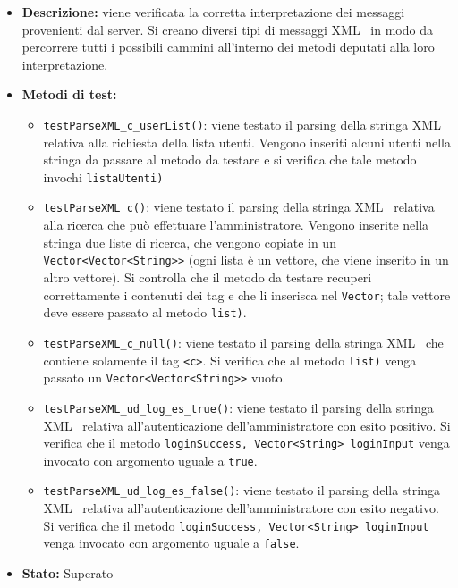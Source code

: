 {\begin{sloppypar}
{{\begin{itemize}
\begin{itemize}
					\item[] \textbf{Descrizione:} viene verificata la corretta interpretazione dei messaggi provenienti dal server. Si creano diversi tipi di messaggi XML\g~ in modo da percorrere tutti i possibili cammini all'interno dei metodi deputati alla loro interpretazione.

					\item[] \textbf{Metodi di test:}

					\begin{itemize}
						\item \texttt{testParseXML\_c\_userList()}: viene testato il parsing della stringa XML\g~ relativa alla richiesta della lista utenti. Vengono inseriti alcuni utenti nella stringa da passare al metodo da testare e si verifica che tale metodo invochi  \texttt{listaUtenti)}
						
						\item \texttt{testParseXML\_c()}: viene testato il parsing della stringa XML\g~ relativa alla ricerca che può effettuare l'amministratore. Vengono inserite nella stringa due liste di ricerca, che vengono copiate in un \texttt{Vector<Vector<String>>} (ogni lista è un vettore, che viene inserito in un altro vettore). Si controlla che il metodo da testare recuperi correttamente i contenuti dei tag e che li inserisca nel \texttt{Vector}; tale vettore deve essere passato al metodo  \texttt{list)}.
						
						\item \texttt{testParseXML\_c\_null()}: viene testato il parsing della stringa XML\g~ che contiene solamente il tag \texttt{<c>}. Si verifica che al metodo  \texttt{list)} venga passato un \texttt{Vector<Vector<String>>} vuoto.
						
						\item \texttt{testParseXML\_ud\_log\_es\_true()}: viene testato il parsing della stringa XML\g~ relativa all'autenticazione dell'amministratore con esito positivo. Si verifica che il metodo  \texttt{loginSuccess, Vector<String> loginInput} venga invocato con argomento uguale a \texttt{true}.
						
						\item \texttt{testParseXML\_ud\_log\_es\_false()}: viene testato il parsing della stringa XML\g~ relativa all'autenticazione dell'amministratore con esito negativo. Si verifica che il metodo  \texttt{loginSuccess, Vector<String> loginInput} venga invocato con argomento uguale a \texttt{false}.
					\end{itemize}
					\item[] \textbf{Stato:} Superato


\end{itemize}
\end{itemize}}}
\end{sloppypar}}
